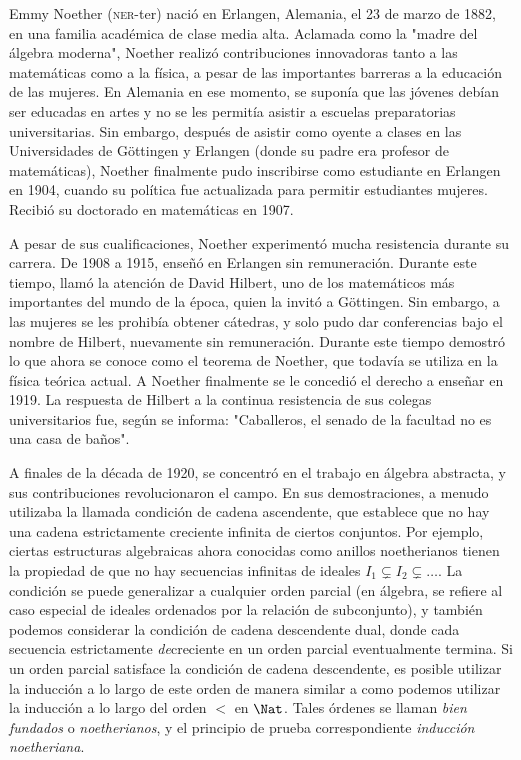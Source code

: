 \documentclass[../../../include/open-logic-section]{subfiles}
\begin{document}



Emmy Noether (\textsc{ner}-ter) nació en Erlangen, Alemania, el 23 de marzo de 1882, en una familia académica de clase media alta. Aclamada como la "madre del álgebra moderna", Noether realizó contribuciones innovadoras tanto a las matemáticas como a la física, a pesar de las importantes barreras a la educación de las mujeres. En Alemania en ese momento, se suponía que las jóvenes debían ser educadas en artes y no se les permitía asistir a escuelas preparatorias universitarias. Sin embargo, después de asistir como oyente a clases en las Universidades de G\"{o}ttingen y Erlangen (donde su padre era profesor de matemáticas), Noether finalmente pudo inscribirse como estudiante en Erlangen en 1904, cuando su política fue actualizada para permitir estudiantes mujeres. Recibió su doctorado en matemáticas en 1907.

A pesar de sus cualificaciones, Noether experimentó mucha resistencia durante su carrera. De 1908 a 1915, enseñó en Erlangen sin remuneración. Durante este tiempo, llamó la atención de David Hilbert, uno de los matemáticos más importantes del mundo de la época, quien la invitó a G\"{o}ttingen. Sin embargo, a las mujeres se les prohibía obtener cátedras, y solo pudo dar conferencias bajo el nombre de Hilbert, nuevamente sin remuneración. Durante este tiempo demostró lo que ahora se conoce como el teorema de Noether, que todavía se utiliza en la física teórica actual. A Noether finalmente se le concedió el derecho a enseñar en 1919. La respuesta de Hilbert a la continua resistencia de sus colegas universitarios fue, según se informa: "Caballeros, el senado de la facultad no es una casa de baños".

A finales de la década de 1920, se concentró en el trabajo en álgebra abstracta, y sus contribuciones revolucionaron el campo. En sus demostraciones, a menudo utilizaba la llamada condición de cadena ascendente, que establece que no hay una cadena estrictamente creciente infinita de ciertos conjuntos. Por ejemplo, ciertas estructuras algebraicas ahora conocidas como anillos noetherianos tienen la propiedad de que no hay secuencias infinitas de ideales $I_1 \subsetneq I_2 \subsetneq \dots$. La condición se puede generalizar a cualquier orden parcial (en álgebra, se refiere al caso especial de ideales ordenados por la relación de subconjunto), y también podemos considerar la condición de cadena descendente dual, donde cada secuencia estrictamente \emph{de}creciente en un orden parcial eventualmente termina. Si un orden parcial satisface la condición de cadena descendente, es posible utilizar la inducción a lo largo de este orden de manera similar a como podemos utilizar la inducción a lo largo del orden $<$ en $\Nat$. Tales órdenes se llaman \emph{bien fundados} o \emph{noetherianos}, y el principio de prueba correspondiente \emph{inducción noetheriana}.
\end{document}
